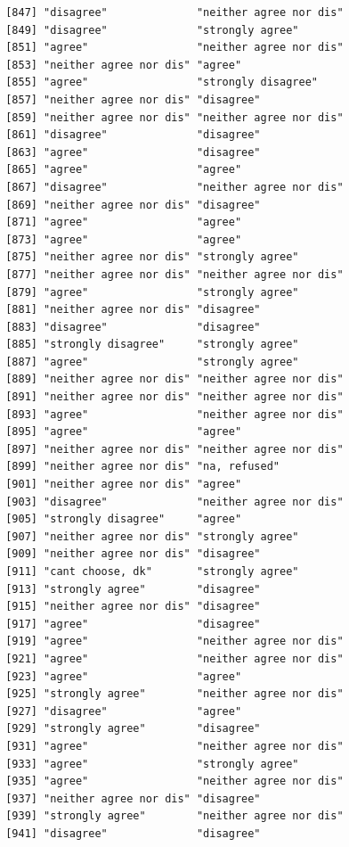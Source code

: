 \documentclass{beamer}\usepackage[]{graphicx}\usepackage[]{color}
\makeatletter
\newenvironment{kframe}{%
 \def\at@end@of@kframe{}%
 \ifinner\ifhmode%
  \def\at@end@of@kframe{\end{minipage}}%
  \begin{minipage}{\columnwidth}%
 \fi\fi%
 \def\FrameCommand##1{\hskip\@totalleftmargin \hskip-\fboxsep
 \colorbox{shadecolor}{##1}\hskip-\fboxsep
     \hskip-\linewidth \hskip-\@totalleftmargin \hskip\columnwidth}%
 \MakeFramed {\advance\hsize-\width
   \@totalleftmargin\z@ \linewidth\hsize
   \@setminipage}}%
 {\par\unskip\endMakeFramed%
 \at@end@of@kframe}
\newenvironment{knitrout}{}{} %
\makeatother
\begin{document}
\begin{frame}[fragile]
\begin{knitrout}
\begin{kframe}
\begin{verbatim}
 [847] "disagree"              "neither agree nor dis"
 [849] "disagree"              "strongly agree"       
 [851] "agree"                 "neither agree nor dis"
 [853] "neither agree nor dis" "agree"                
 [855] "agree"                 "strongly disagree"    
 [857] "neither agree nor dis" "disagree"             
 [859] "neither agree nor dis" "neither agree nor dis"
 [861] "disagree"              "disagree"             
 [863] "agree"                 "disagree"             
 [865] "agree"                 "agree"                
 [867] "disagree"              "neither agree nor dis"
 [869] "neither agree nor dis" "disagree"             
 [871] "agree"                 "agree"                
 [873] "agree"                 "agree"                
 [875] "neither agree nor dis" "strongly agree"       
 [877] "neither agree nor dis" "neither agree nor dis"
 [879] "agree"                 "strongly agree"       
 [881] "neither agree nor dis" "disagree"             
 [883] "disagree"              "disagree"             
 [885] "strongly disagree"     "strongly agree"       
 [887] "agree"                 "strongly agree"       
 [889] "neither agree nor dis" "neither agree nor dis"
 [891] "neither agree nor dis" "neither agree nor dis"
 [893] "agree"                 "neither agree nor dis"
 [895] "agree"                 "agree"                
 [897] "neither agree nor dis" "neither agree nor dis"
 [899] "neither agree nor dis" "na, refused"          
 [901] "neither agree nor dis" "agree"                
 [903] "disagree"              "neither agree nor dis"
 [905] "strongly disagree"     "agree"                
 [907] "neither agree nor dis" "strongly agree"       
 [909] "neither agree nor dis" "disagree"             
 [911] "cant choose, dk"       "strongly agree"       
 [913] "strongly agree"        "disagree"             
 [915] "neither agree nor dis" "disagree"             
 [917] "agree"                 "disagree"             
 [919] "agree"                 "neither agree nor dis"
 [921] "agree"                 "neither agree nor dis"
 [923] "agree"                 "agree"                
 [925] "strongly agree"        "neither agree nor dis"
 [927] "disagree"              "agree"                
 [929] "strongly agree"        "disagree"             
 [931] "agree"                 "neither agree nor dis"
 [933] "agree"                 "strongly agree"       
 [935] "agree"                 "neither agree nor dis"
 [937] "neither agree nor dis" "disagree"             
 [939] "strongly agree"        "neither agree nor dis"
 [941] "disagree"              "disagree"             

\end{verbatim}
\end{kframe}
\end{knitrout}
\end{frame}
\end{document}
